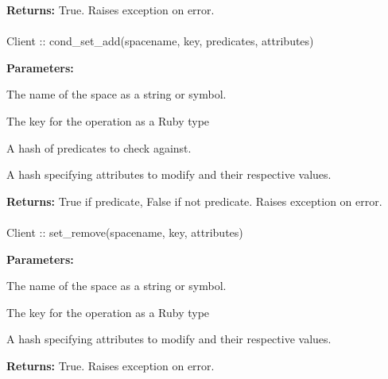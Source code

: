 \noindent\textbf{Returns:}
True.  Raises exception on error.

\paragraph{}
\begin{ccode}
Client :: cond_set_add(spacename, key, predicates, attributes)
\end{ccode}
\funcdesc 

\noindent\textbf{Parameters:}
\begin{description}[labelindent=\widthof{{\code{predicates}}},leftmargin=*,noitemsep,nolistsep,align=right]
\item[\code{spacename}] The name of the space as a string or symbol.
\item[\code{key}] The key for the operation as a Ruby type
\item[\code{predicates}] A hash of predicates to check against.
\item[\code{attributes}] A hash specifying attributes to modify and their respective values.
\end{description}

\noindent\textbf{Returns:}
True if predicate, False if not predicate.  Raises exception on error.

\paragraph{}
\begin{ccode}
Client :: set_remove(spacename, key, attributes)
\end{ccode}
\funcdesc 

\noindent\textbf{Parameters:}
\begin{description}[labelindent=\widthof{{\code{attributes}}},leftmargin=*,noitemsep,nolistsep,align=right]
\item[\code{spacename}] The name of the space as a string or symbol.
\item[\code{key}] The key for the operation as a Ruby type
\item[\code{attributes}] A hash specifying attributes to modify and their respective values.
\end{description}

\noindent\textbf{Returns:}
True.  Raises exception on error.

